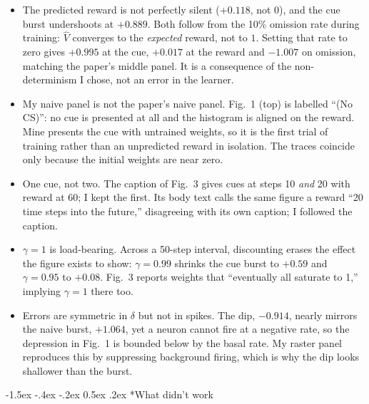 \documentclass[10pt]{article}
\makeatletter
\renewcommand\section{\@startsection{section}{1}{\z@}%
  {-1.5ex \@plus -.4ex \@minus -.2ex}%
  {0.5ex \@plus .2ex}%
  {\normalfont\bfseries}}
\makeatother
\begin{document}
\begin{itemize}
  \item The predicted reward is not perfectly silent ($+0.118$, not $0$), and the cue burst
  undershoots at $+0.889$. Both follow from the 10\% omission rate during training: $\hat{V}$
  converges to the \emph{expected} reward, not to $1$. Setting that rate to zero gives $+0.995$ at
  the cue, $+0.017$ at the reward and $-1.007$ on omission, matching the paper's middle panel. It is
  a consequence of the non-determinism I chose, not an error in the learner.
  \item My naive panel is not the paper's naive panel. Fig.~1 (top) is labelled ``(No CS)'':
  no cue is presented at all and the histogram is aligned on the reward. Mine presents the cue with
  untrained weights, so it is the first trial of training rather than an unpredicted reward in
  isolation. The traces coincide only because the initial weights are near zero.
  \item One cue, not two. The caption of Fig.~3 gives cues at steps 10 \emph{and} 20 with
  reward at 60; I kept the first. Its body text calls the same figure a reward ``20 time steps into
  the future,'' disagreeing with its own caption; I followed the caption.
  \item $\gamma = 1$ is load-bearing. Across a 50-step interval, discounting erases the
  effect the figure exists to show: $\gamma = 0.99$ shrinks the cue burst to $+0.59$ and
  $\gamma = 0.95$ to $+0.08$. Fig.~3 reports weights that ``eventually all saturate to 1,'' implying
  $\gamma = 1$ there too.
  \item Errors are symmetric in $\delta$ but not in spikes. The dip, $-0.914$, nearly
  mirrors the naive burst, $+1.064$, yet a neuron cannot fire at a negative rate, so the depression
  in Fig.~1 is bounded below by the basal rate. My raster panel reproduces this by suppressing
  background firing, which is why the dip looks shallower than the burst.
\end{itemize}

\section*{What didn't work}
\end{document}

